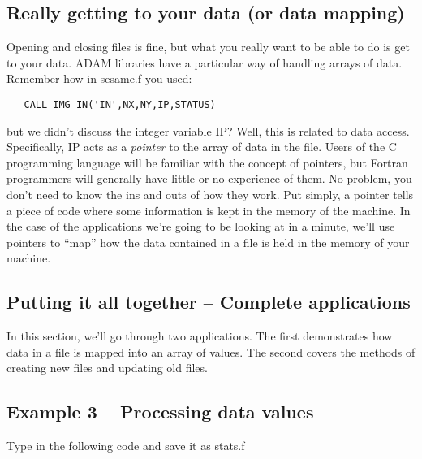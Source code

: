 \subsection{Really getting to your data (or data mapping)}

Opening and closing files is fine, but what you really want to be able to
do is get to your data. ADAM libraries have a particular way of handling
arrays of data. Remember how in {\sf sesame.f} you used:

\begin{verbatim}
   CALL IMG_IN('IN',NX,NY,IP,STATUS)
\end{verbatim}

but we didn't discuss the integer variable {\sf IP}? Well, this is
related to data access. Specifically, {\sf IP} acts as a {\it
pointer} to the array of data in the file. Users of the C programming
language will be familiar with the concept of pointers, but Fortran
programmers will generally have little or no experience of them. No problem,
you don't need to know the ins and outs of how they work. Put simply, a
pointer tells a piece of code where some information is kept in the memory
of the machine. In the case of the applications we're going to be looking
at in a minute, we'll use pointers to ``map'' how the data contained in a
file is held in the memory of your machine.

\subsection{Putting it all together -- Complete applications}

In this section, we'll go through two applications. The first demonstrates
how data in a file is mapped into an array of values. The second covers
the methods of creating new files and updating old files.

\subsection{Example 3 -- Processing data values}

Type in the following code and save it as {\sf stats.f}

